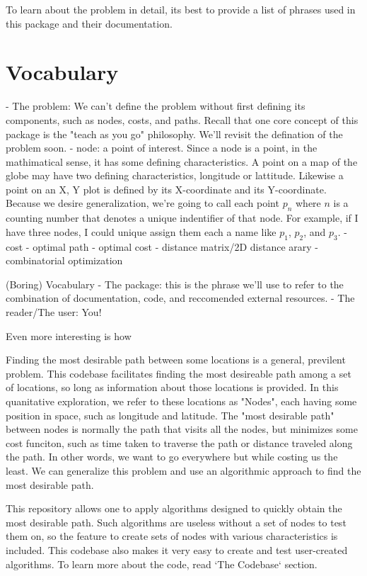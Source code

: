 \documentclass[12pt]{article}
\begin{document}
To learn about the problem in detail, its best to provide a list of phrases used in this package and their documentation.

\section{Vocabulary}

- The problem: We can't define the problem without first defining its components, such as nodes, costs, and paths.  Recall that one core concept of this package is the "teach as you go" philosophy.  We'll revisit the defination of the problem soon.
- node: a point of interest.  Since a node is a point, in the mathimatical sense, it has some defining characteristics.  A point on a map of the globe may have two defining characteristics, longitude or lattitude.  Likewise a point on an X, Y plot is defined by its X-coordinate and its Y-coordinate.  Because we desire generalization, we're going to call each point $p_n$ where  $n$ is a counting number that denotes a unique indentifier of that node.  For example, if I have three nodes, I could unique assign them each a name like $p_1$, $p_2$, and $p_3$.
- cost
- optimal path
- optimal cost
- distance matrix/2D distance arary
- combinatorial optimization

(Boring) Vocabulary
- The package: this is the phrase we'll use to refer to the combination of documentation, code, and reccomended external resources.
- The reader/The user: You!



Even more interesting is how 

Finding the most desirable path between some locations is a general, previlent problem.  This codebase facilitates finding the most desireable path among a set of locations, so long as information about those locations is provided.  In this quanitative exploration, we refer to these locations as "Nodes", each having some position in space, such as longitude and latitude.  The "most desirable path" between nodes is normally the path that visits all the nodes, but minimizes some cost funciton, such as time taken to traverse the path or distance traveled along the path.  In other words, we want to go everywhere but while costing us the least.  We can generalize this problem and use an algorithmic approach to find the most desirable path.

This repository allows one to apply algorithms designed to quickly obtain the most desirable path.  Such algorithms are useless without a set of nodes to test them on, so the feature to create sets of nodes with various characteristics is included.  This codebase also makes it very easy to create and test user-created algorithms.  To learn more about the code, read `The Codebase` section.
\end{document}
